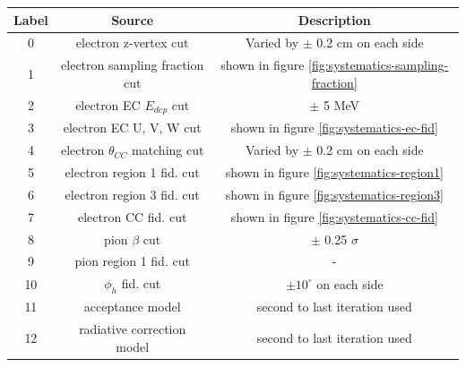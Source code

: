 \begin{table}
	\centering
	\label{table:systematic-sources}
	
	\begin{tabular}{c | c | c }
	
	Label & Source & Description \\ 
	\hline 
	
	0      & electron z-vertex cut                          & Varied by $\pm$ 0.2 cm on each side \\ 
	1      & electron sampling fraction cut            & shown in figure \ref{fig:systematics-sampling-fraction} \\ 
	2      & electron EC $E_{dep}$ cut                  & $\pm$ 5 MeV \\ 
	3      & electron EC U, V, W cut                       & shown in figure \ref{fig:systematics-ec-fid} \\ 
	4      & electron $\theta_{CC}$ matching cut & Varied by $\pm$ 0.2 cm on each side \\ 
	5      & electron region 1 fid. cut                      & shown in figure \ref{fig:systematics-region1} \\ 
	6      & electron region 3 fid. cut                     & shown in figure \ref{fig:systematics-region3} \\ 
	7      & electron CC fid. cut                              & shown in figure \ref{fig:systematics-cc-fid} \\ 
	8      & pion $\beta$ cut                                   & $\pm$ 0.25 $\sigma$ \\ 
	9      & pion region 1 fid. cut                             & - \\ 
	10    & $\phi_h$ fid. cut                                    & $\pm 10^{\circ}$ on each side \\ 
	11     & acceptance model                                & second to last iteration used \\ 
    12     & radiative correction model                   & second to last iteration used \\ 
	
	\end{tabular}		
\end{table}

